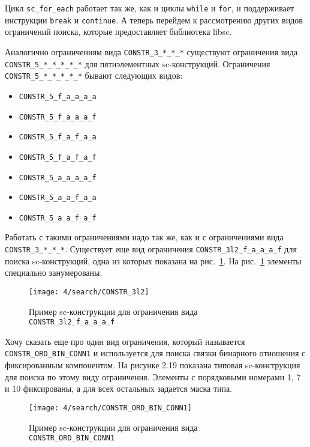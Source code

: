 Цикл \lstinline|sc_for_each| работает так же, как и циклы
\lstinline|while| и \lstinline|for|, и поддерживает инструкции
\lstinline|break| и \lstinline|continue|.  А теперь перейдем к
рассмотрению других видов ограничений поиска, которые предоставляет
библиотека libsc.

Аналогично ограничениям вида \verb|CONSTR_3_*_*_*| существуют
ограничения вида \verb|CONSTR_5_*_*_*_*_*| для пятиэлементных
sc-конструкций. Ограничения \verb|CONSTR_5_*_*_*_*_*| бывают следующих
видов:
\begin{itemize}
\item \lstinline|CONSTR_5_f_a_a_a_a|
\item \lstinline|CONSTR_5_f_a_a_a_f|
\item \lstinline|CONSTR_5_f_a_f_a_a|
\item \lstinline|CONSTR_5_f_a_f_a_f|
\item \lstinline|CONSTR_5_a_a_a_a_f|
\item \lstinline|CONSTR_5_a_a_f_a_a|
\item \lstinline|CONSTR_5_a_a_f_a_f|
\end{itemize}

Работать с такими ограничениями надо так же, как и с ограничениями
вида \verb|CONSTR_3_*_*_*|.  Существует еще вид ограничения
\lstinline|CONSTR_3l2_f_a_a_a_f| для поиска sc-конструкций, одна из
которых показана на рис.~\ref{fig:CONSTR_3l2}. На
рис.~\ref{fig:CONSTR_3l2} элементы специально занумерованы.

\begin{figure}
  \centering
  \texttt{[image: 4/search/CONSTR\_3l2]}
  \caption{ Пример sc-конструкции для ограничения вида
    \lstinline|CONSTR_3l2_f_a_a_a_f|}
  \label{fig:CONSTR_3l2}
\end{figure}

Хочу сказать еще про один вид ограничения, который называется
\lstinline|CONSTR_ORD_BIN_CONN1| и используется для поиска связки бинарного
отношения с фиксированным компонентом. На рисунке 2.19 показана
типовая sc-конструкция для поиска по этому виду ограничения. Элементы
с порядковыми номерами 1, 7 и 10 фиксированы, а для всех остальных
задается маска типа.

\begin{figure}
  \centering
  \texttt{[image: 4/search/CONSTR\_ORD\_BIN\_CONN1]}
  \caption{ Пример sc-конструкции для ограничения вида
    \lstinline|CONSTR_ORD_BIN_CONN1|}
  \label{fig:CONSTR_ORD_BIN_CONN1}
\end{figure}

